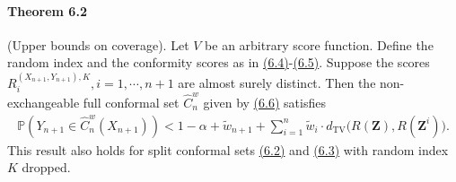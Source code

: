 \documentclass{article}
\numberwithin{equation}{section}
\begin{document}
\paragraph{Theorem 6.2\label{Theorem 6.2}} (Upper bounds on coverage). Let $V$ be an arbitrary score function. Define the random index and the conformity scores as in \hyperref[6.4]{(6.4)}-\hyperref[6.5]{(6.5)}. Suppose the scores $R_i^{(X_{n+1},Y_{n+1}),K},i=1,\cdots,n+1$ are almost surely distinct. Then the non-exchangeable full conformal set $\widehat{C}_n^w$ given by \hyperref[6.6]{(6.6)} satisfies
\begin{align*}
	\mathbb{P}\left(Y_{n+1}\in\widehat{C}_n^w(X_{n+1})\right) < 1-\alpha + \widetilde{w}_{n+1} + \sum_{i=1}^n\widetilde{w}_i\cdot d_\mathrm{TV}\bigl(R(\mathbf{Z}),R(\mathbf{Z}^i)\bigr).\tag{6.17}\label{6.17}
\end{align*}
This result also holds for split conformal sets \hyperref[6.2]{(6.2)} and \hyperref[6.3]{(6.3)} with random index $K$ dropped.
\end{document}
